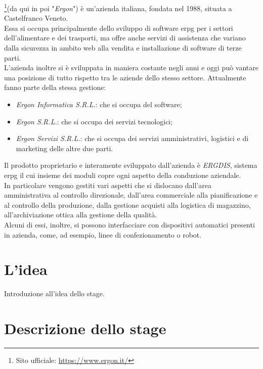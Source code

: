 \noindent{\myCompany}\footnote{Sito ufficiale: \url{https://www.ergon.it/}}(da qui in poi "\textit{Ergon}") è un'azienda italiana, fondata nel 1988, 
situata a Castelfranco Veneto.\\
Essa si occupa principalmente dello sviluppo di software \gls{erpg} per i settori dell'alimentare e dei trasporti, ma offre anche servizi di assistenza
che variano dalla sicurezza in ambito web alla vendita e installazione di software di terze parti.\\
L'azienda inoltre si è sviluppata in maniera costante negli anni e oggi può vantare una posizione di tutto rispetto tra le aziende dello stesso settore.
Attualmente fanno parte della stessa gestione:
\begin{itemize}
    \item \textit{Ergon Informatica S.R.L.}: che si occupa del software;
    \item \textit{Ergon S.R.L.}: che si occupa dei servizi tecnologici;
    \item \textit{Ergon Servizi S.R.L.}: che si occupa dei servizi amministrativi, logistici e di marketing delle altre due parti.
\end{itemize}
Il prodotto proprietario e interamente sviluppato dall'azienda è \textit{ERGDIS}, sistema \gls{erpg}
il cui insieme dei moduli copre ogni aspetto della conduzione aziendale.\\
In particolare vengono gestiti vari aspetti che si dislocano dall'area amministrativa al controllo direzionale,
dall'area commerciale alla pianificazione e al controllo della produzione, dalla gestione acquisti alla logistica di magazzino, 
all'archiviazione ottica alla gestione della qualità.\\
Alcuni di essi, inoltre, si possono interfacciare con dispositivi automatici presenti in azienda, come, ad esempio,
linee di confezionamento o robot.\\
 

\section{L'idea}

Introduzione all'idea dello stage.

\section{Descrizione dello stage}

